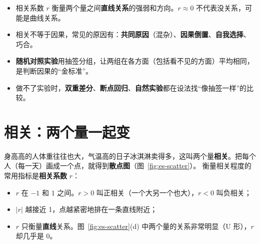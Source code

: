 
\begin{keypoints}
\begin{itemize}
  \item 相关系数 $r$ 衡量两个量之间\textbf{直线关系}的强弱和方向。$r\approx0$ 不代表没关系，可能是曲线关系。
  \item 相关不等于因果，常见的原因有：\textbf{共同原因}（混杂）、\textbf{因果倒置}、\textbf{自我选择}、巧合。
  \item \textbf{随机对照实验}用抽签分组，让两组在各方面（包括看不见的方面）平均相同，是判断因果的“金标准”。
  \item 做不了实验时，\textbf{双重差分}、\textbf{断点回归}、\textbf{自然实验}都在设法找“像抽签一样”的比较。
\end{itemize}
\end{keypoints}

\section{相关：两个量一起变}

身高高的人体重往往也大，气温高的日子冰淇淋卖得多，这叫两个量\textbf{相关}。把每个人（每一天）画成一个点，就得到\textbf{散点图}（图~\ref{fig:es-scatter}）。
衡量相关程度的常用指标是\textbf{相关系数} $r$：
\begin{itemize}
  \item $r$ 在 $-1$ 和 $1$ 之间。$r>0$ 叫正相关（一个大另一个也大），$r<0$ 叫负相关；
  \item $|r|$ 越接近 1，点越紧密地排在一条直线附近；
  \item $r$ 只衡量\textbf{直线}关系。图~\ref{fig:es-scatter}(d) 中两个量的关系非常明显（U 形），$r$ 却几乎是 0。
\end{itemize}

